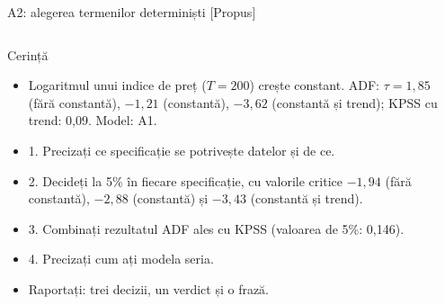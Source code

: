\begin{frame}{A2: alegerea termenilor determiniști [Propus]}
\propsub
\itemsize{\scriptsize}
\begin{columns}[T]
\begin{column}{\taskw}
\begin{block}{Cerință}
\begin{itemize}
    \item Logaritmul unui indice de preț ($T = 200$) crește constant. ADF: $\tau = 1{,}85$ (fără constantă), $-1{,}21$ (constantă), $-3{,}62$ (constantă și trend); KPSS cu trend: 0,09. Model: A1.
    \item 1. Precizați ce specificație se potrivește datelor și de ce.
    \item 2. Decideți la 5\% în fiecare specificație, cu valorile critice $-1{,}94$ (fără constantă), $-2{,}88$ (constantă) și $-3{,}43$ (constantă și trend).
    \item 3. Combinați rezultatul ADF ales cu KPSS (valoarea de 5\%: 0,146).
    \item 4. Precizați cum ați modela seria.
    \item Raportați: trei decizii, un verdict și o frază.
\end{itemize}
\end{block}
\end{column}
\begin{column}{\solw}
\end{column}
\end{columns}
\end{frame}

